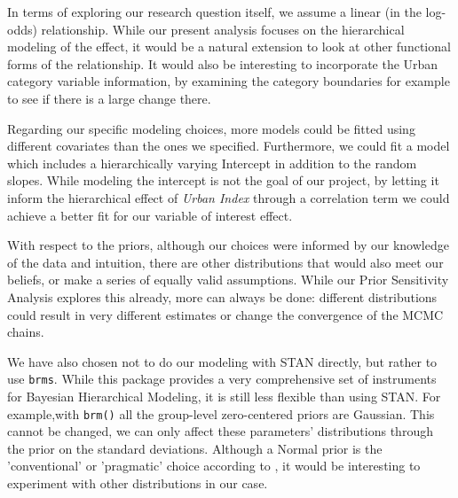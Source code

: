 \documentclass[12pt]{article}
\begin{document}

In terms of exploring our research question itself, we assume a linear (in the log-odds) relationship. While our present analysis focuses on the hierarchical modeling of the effect, it would be a natural extension to look at other functional forms of the relationship. It would also be interesting to incorporate the Urban category variable information, by examining the category boundaries for example to see if there is a large change there.

Regarding our specific modeling choices, more models could be fitted using different covariates than the ones we specified. Furthermore, we could fit a model which includes a hierarchically varying Intercept in addition to the random slopes. While modeling the intercept is not the goal of our project, by letting it inform the hierarchical effect of \textit{Urban Index} through a correlation term we could achieve a better fit for our variable of interest effect.


With respect to the priors, although our choices were informed by our knowledge of the data and intuition, there are other distributions that would also meet our beliefs, or make a series of equally valid assumptions. While our Prior Sensitivity Analysis explores this already, more can always be done: different distributions could result in very different estimates or change the convergence of the MCMC chains. 


We have also chosen not to do our modeling with STAN directly, but rather to use \verb|brms|. While this package provides a very comprehensive set of instruments for Bayesian Hierarchical Modeling, it is still less flexible than using STAN. For example,with \verb|brm()| all the group-level zero-centered priors are Gaussian. This cannot be changed, we can only affect these parameters' distributions through the prior on the standard deviations. Although a Normal prior is the 'conventional' or 'pragmatic' choice according to \cite{mcelreath2016statistical}, it would be interesting to experiment with other distributions in our case.
\end{document}
